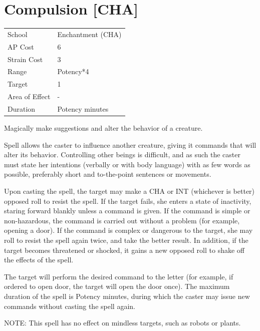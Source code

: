 \documentclass[11pt,a4paper,twocolumn]{book}
\begin{document}
\section*{Compulsion [CHA]}
{
	\begin{tabu} to 75mm{| X[l,4] | X[l,7] |}
		\hline
		School 			& Enchantment (CHA) 	\\
        AP Cost	      	& 6 					\\
        Strain Cost     & 3 					\\
        Range     		& Potency*4				\\
        Target      	& 1 					\\
        Area of Effect  & - 	 				\\
        Duration     	& Potency minutes 		\\ \hline
	\end{tabu}
		
}

\medskip

Magically make suggestions and alter the behavior of a creature.

Spell allows the caster to influence another creature, giving it commands that will alter its behavior. Controlling other beings is difficult, and as such the caster must state her intentions (verbally or with body language) with as few words as possible, preferably short and to-the-point sentences or movements.

Upon casting the spell, the target may make a CHA or INT (whichever is better) opposed roll to resist the spell. If the target fails, she enters a state of inactivity, staring forward blankly unless a command is given. If the command is simple or non-hazardous, the command is carried out without a problem (for example, opening a door). If the command is complex or dangerous to the target, she may roll to resist the spell again twice, and take the better result. In addition, if the target becomes threatened or shocked, it gains a new opposed roll to shake off the effects of the spell.

The target will perform the desired command to the letter (for example, if ordered to open door, the target will open the door once). The maximum duration of the spell is Potency minutes, during which the caster may issue new commands without casting the spell again.

NOTE: This spell has no effect on mindless targets, such as robots or plants.
\end{document}
